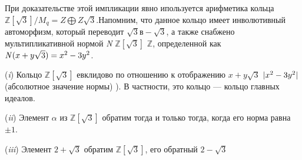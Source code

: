 \documentclass{mai_book}
\begin{document}
	При доказательстве этой импликации явно ипользуется арифметика кольца $\mathbb Z[\sqrt{3}]/M_{q} = Z \bigoplus Z\sqrt{3}$.Напомним, что данное кольцо имеет инволютивный автоморфизм, который переводит $\sqrt{3} в -\sqrt{3}$, а также снабжено мультипликативной нормой {\it N} $\mathbb  Z[\sqrt{3}]$ \textrightarrow $\mathbb Z$, определенной как ${\it N}(x+y\sqrt{3})=x^2-3y^2$.
	\noindent
	\begin{lemma}
	
	\noindent
	
	({\it i})  Кольцо $\mathbb Z[\sqrt{3}]$ евклидово по отношению к отображению $x+y\sqrt{3}$ \textrightarrow $\arrowvert{x^2-3y^2}\arrowvert$ (абсолютное значение нормы) ). В частности, это кольцо — кольцо главных идеалов.
	
	\noindent
	
	({\it ii})  Элемент $\alpha$ из $\mathbb Z[\sqrt{3}]$ обратим тогда и только тогда, когда его
	норма равна $\pm1$.
	\noindent

	({\it iii}) Элемент $2+\sqrt{3}$ обратим $\mathbb Z[\sqrt{3}]$, его обратный $2-\sqrt{3}$
	\noindent
	\end{lemma}
\end{document}
